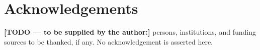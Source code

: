 \section*{Acknowledgements}
\noindent\textbf{[TODO --- to be supplied by the author:]} persons,
institutions, and funding sources to be thanked, if any. No
acknowledgement is asserted here.
